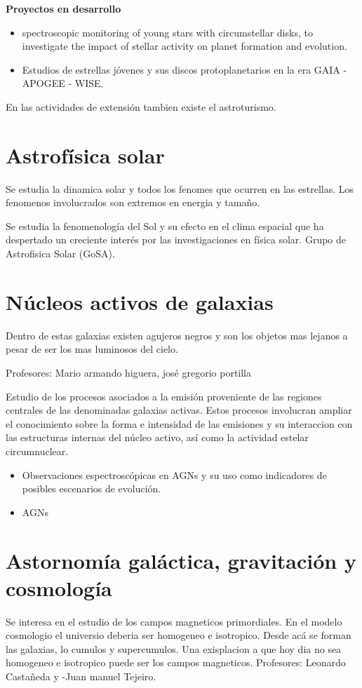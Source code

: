 \documentclass{article}
\begin{document}
\textbf{Proyectos en desarrollo }
\begin{itemize}
  \item spectroscopic monitoring of young stars with circumstellar disks, to investigate the impact of stellar activity on planet formation and evolution. 
  \item Estudios de estrellas jóvenes y sus discos protoplanetarios en la era GAIA - APOGEE - WISE.
\end{itemize}

En las actividades de extensión tambien existe el astroturismo.

\section{Astrofísica solar }
Se estudia la dinamica solar y todos los fenomes que ocurren en las estrellas. Los fenomenos involucrados son extremos en energia y tamaño.

Se estudia la fenomenología del Sol y su efecto en el clima espacial que ha despertado un creciente interés por las investigaciones en física solar. Grupo de Astrofisica Solar (GoSA). 

\section{Núcleos activos de galaxias }
Dentro de estas galaxias existen agujeros negros y son los objetos mas lejanos a pesar de ser los mas luminosos del cielo.

Profesores: Mario armando higuera, josé gregorio portilla 

Estudio de los procesos asociados a la emisión proveniente de las regiones centrales de las denominadas galaxias activas. Estos procesos involucran ampliar el conocimiento sobre la forma e intensidad de las emisiones y su interaccion con las estructuras internas del núcleo activo, así como la actividad estelar circumnuclear. 

\begin{itemize}
  \item Observaciones espectroscópicas en AGNs y su uso como indicadores de posibles escenarios de evolución. 
  \item AGNs 
\end{itemize}

\section{Astornomía galáctica, gravitación y cosmología }
Se interesa en el estudio de los campos magneticos primordiales. En el modelo cosmologio el universio deberia ser homogeneo e isotropico. Desde acá se forman las galaxias, lo cumulos y supercumulos. Una exisplacion a que hoy dia no sea homogeneo e isotropico puede ser los campos magneticos. Profesores: Leonardo Castañeda y -Juan manuel Tejeiro.
\end{document}

